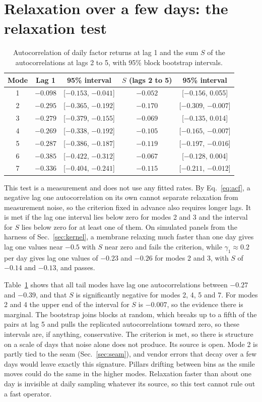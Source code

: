 \documentclass[11pt]{article}
\begin{document}
\section{Relaxation over a few days: the relaxation test}
\label{sec:relax}

\begin{table}[t]
\centering
\caption{Autocorrelation of daily factor returns at lag 1 and the sum $S$ of the autocorrelations at lags 2 to 5, with 95\% block bootstrap intervals.}
\label{tab:acf}
\begin{tabular}{ccccc}
\toprule
Mode & Lag 1 & 95\% interval & $S$ (lags 2 to 5) & 95\% interval \\
\midrule
1 & $-0.098$ & [$-0.153$, $-0.041$] & $-0.052$ & [$-0.156$, 0.055] \\
2 & $-0.295$ & [$-0.365$, $-0.192$] & $-0.170$ & [$-0.309$, $-0.007$] \\
3 & $-0.279$ & [$-0.379$, $-0.155$] & $-0.069$ & [$-0.135$, 0.014] \\
4 & $-0.269$ & [$-0.338$, $-0.192$] & $-0.105$ & [$-0.165$, $-0.007$] \\
5 & $-0.287$ & [$-0.386$, $-0.187$] & $-0.119$ & [$-0.197$, $-0.016$] \\
6 & $-0.385$ & [$-0.422$, $-0.312$] & $-0.067$ & [$-0.128$, 0.004] \\
7 & $-0.336$ & [$-0.404$, $-0.241$] & $-0.115$ & [$-0.211$, $-0.012$] \\
\bottomrule
\end{tabular}
\end{table}

This test is a measurement and does not use any fitted rates. By Eq.~\eqref{eq:acf}, a negative lag one autocorrelation on its own cannot separate relaxation from measurement noise, so the criterion fixed in advance also requires longer lags. It is met if the lag one interval lies below zero for modes 2 and 3 and the interval for $S$ lies below zero for at least one of them. On simulated panels from the harness of Sec.~\ref{sec:kernel}, a membrane relaxing much faster than one day gives lag one values near $-0.5$ with $S$ near zero and fails the criterion, while $\gamma_1\approx0.2$ per day gives lag one values of $-0.23$ and $-0.26$ for modes 2 and 3, with $S$ of $-0.14$ and $-0.13$, and passes.

Table~\ref{tab:acf} shows that all tail modes have lag one autocorrelations between $-0.27$ and $-0.39$, and that $S$ is significantly negative for modes 2, 4, 5 and 7. For modes 2 and 4 the upper end of the interval for $S$ is $-0.007$, so the evidence there is marginal. The bootstrap joins blocks at random, which breaks up to a fifth of the pairs at lag 5 and pulls the replicated autocorrelations toward zero, so these intervals are, if anything, conservative. The criterion is met, so there is structure on a scale of days that noise alone does not produce. Its source is open. Mode 2 is partly tied to the seam (Sec.~\ref{sec:seam}), and vendor errors that decay over a few days would leave exactly this signature. Pillars drifting between bins as the smile moves could do the same in the higher modes. Relaxation faster than about one day is invisible at daily sampling whatever its source, so this test cannot rule out a fast operator.
\end{document}
